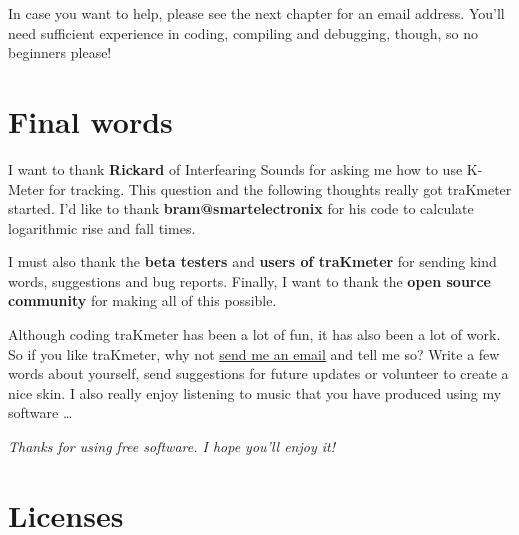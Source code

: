 In case you want to help, please see the next chapter for an email
address.  You’ll need sufficient experience in coding, compiling and
debugging, though, so no beginners please!

\chapter{Final words}
\label{chap:final_words}

I want to thank \textbf{Rickard} of Interfearing Sounds for asking me
how to use K-Meter for tracking.  This question and the following
thoughts really got traKmeter started.  I'd like to thank
\textbf{bram@smartelectronix} for his code to calculate logarithmic
rise and fall times.

I must also thank the \textbf{beta testers} and \textbf{users of
  traKmeter} for sending kind words, suggestions and bug reports.
Finally, I want to thank the \textbf{open source community} for making
all of this possible.

Although coding traKmeter has been a lot of fun, it has also been a
lot of work.  So if you like traKmeter, why not
\href{http://www.mzuther.de/}{send me an email} and tell me so?  Write
a few words about yourself, send suggestions for future updates or
volunteer to create a nice skin.  I also really enjoy listening to
music that you have produced using my software \dots

\emph{Thanks for using free software.  I hope you'll enjoy it!}

\appendix



\chapter{Licenses}

\scriptsize

\normalsize

\scriptsize

\normalsize




